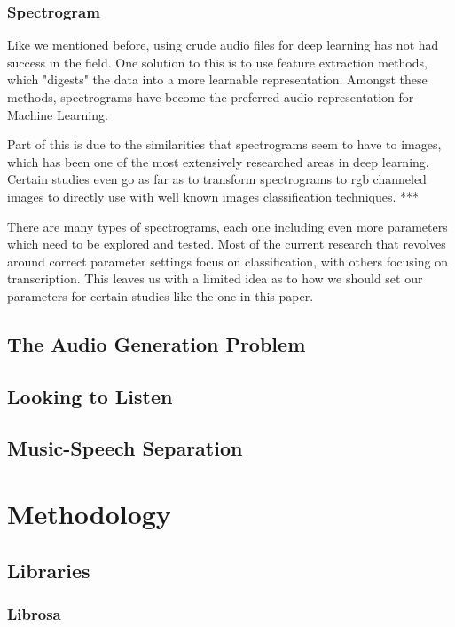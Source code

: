 \documentclass{book}
\begin{document}
\section{Spectrogram}
\par
\qquad Like we mentioned before, using crude audio files for deep learning has not had success in the field.
One solution to this is to use feature extraction methods, which "digests" the data into a more learnable representation.
Amongst these methods, spectrograms have become the preferred audio representation for Machine Learning.
\par
Part of this is due to the similarities that spectrograms seem to have to images, which has been one of the most extensively researched areas in deep learning.
Certain studies even go as far as to transform spectrograms to rgb channeled images to directly use with well known images classification techniques. *** %
\par
There are many types of spectrograms, each one including even more parameters which need to be explored and tested.
Most of the current research that revolves around correct parameter settings focus on classification, with others focusing on transcription.
This leaves us with a limited idea as to how we should set our parameters for certain studies like the one in this paper.
\par

\chapter{The Audio Generation Problem}
\chapter{Looking to Listen}
\chapter{Music-Speech Separation}

\part{Methodology}
\chapter{Libraries}
\section{Librosa}
\end{document}
